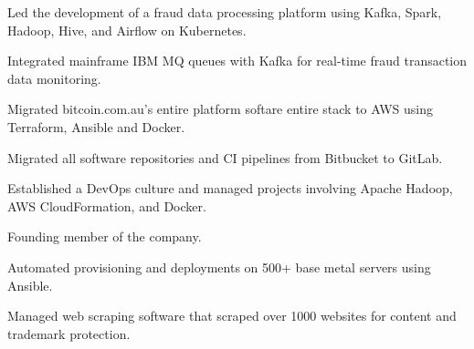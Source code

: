 \documentclass[]{resume}
\begin{document}
\begin{minipage}[t]{0.60\textwidth}
\begin{tightemize}
\item Led the development of a fraud data processing platform using Kafka, Spark, Hadoop, Hive, and Airflow on Kubernetes.
\item Integrated mainframe IBM MQ queues with Kafka for real-time fraud transaction data monitoring.
\end{tightemize}
\sectionsep

\begin{tightemize}
\item Migrated bitcoin.com.au's entire platform softare entire stack to AWS using Terraform, Ansible and Docker.
\item Migrated all software repositories and CI pipelines from Bitbucket to GitLab.
\end{tightemize}
\sectionsep

\begin{tightemize}
\item Established a DevOps culture and managed projects involving Apache Hadoop, AWS CloudFormation, and Docker.
\end{tightemize}
\sectionsep

\begin{tightemize}
\item Founding member of the company.
\item Automated provisioning and deployments on 500+ base metal servers using Ansible.
\item Managed web scraping software that scraped over 1000 websites for content and trademark protection.
\end{tightemize}
\sectionsep

%
%

\end{minipage}
\hfill
\end{document}
